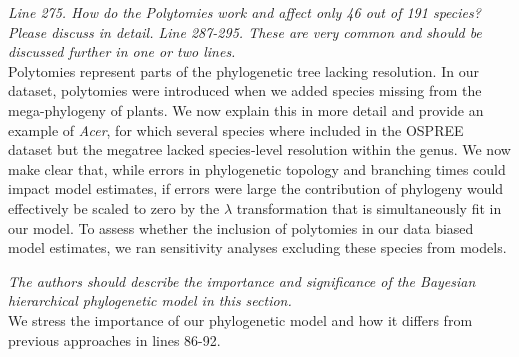 \documentclass[11pt]{article}
\begin{document}
\emph{Line 275. How do the Polytomies work and affect only 46 out of 191 species? Please discuss in detail. Line 287-295. These are very common and should be discussed further in one or two lines.}\\
Polytomies represent parts of the phylogenetic tree lacking resolution. In our dataset, polytomies were introduced when we added species missing from the mega-phylogeny of plants. We now explain this in more detail and provide an example of \emph{Acer}, for which several species where included in the OSPREE dataset but the megatree lacked species-level resolution within the genus. We now make clear that, while errors in phylogenetic topology and branching times could impact model estimates, if errors were large the contribution of phylogeny would effectively be scaled to zero by the $\lambda$ transformation that is simultaneously fit in our model. To assess whether the inclusion of polytomies in our data biased model estimates, we ran sensitivity analyses excluding these species from models. %



\emph{The authors should describe the importance and significance of the Bayesian hierarchical phylogenetic model in this section.}\\
We stress the importance of our phylogenetic model and how it differs from previous approaches in lines 86-92.
\end{document}
